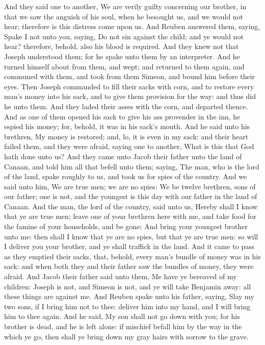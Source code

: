 \begin{biblechapter}
\verse And they said one to another, We are verily guilty concerning our brother, in that we saw the anguish of his soul, when he besought us, and we would not hear; therefore is this distress come upon us.
\verse And Reuben answered them, saying, Spake I not unto you, saying, Do not sin against the child; and ye would not hear? therefore, behold, also his blood is required.
\verse And they knew not that Joseph understood them; for he spake unto them by an interpreter.
\verse And he turned himself about from them, and wept; and returned to them again, and communed with them, and took from them Simeon, and bound him before their eyes.
\verse Then Joseph commanded to fill their sacks with corn, and to restore every man's money into his sack, and to give them provision for the way: and thus did he unto them.
\verse And they laded their asses with the corn, and departed thence.
\verse And as one of them opened his sack to give his ass provender in the inn, he espied his money; for, behold, it was in his sack's mouth.
\verse And he said unto his brethren, My money is restored; and, lo, it is even in my sack: and their heart failed them, and they were afraid, saying one to another, What is this that God hath done unto us?
\verse And they came unto Jacob their father unto the land of Canaan, and told him all that befell unto them; saying,
\verse The man, who is the lord of the land, spake roughly to us, and took us for spies of the country.
\verse And we said unto him, We are true men; we are no spies:
\verse We be twelve brethren, sons of our father; one is not, and the youngest is this day with our father in the land of Canaan.
\verse And the man, the lord of the country, said unto us, Hereby shall I know that ye are true men; leave one of your brethren here with me, and take food for the famine of your households, and be gone:
\verse And bring your youngest brother unto me: then shall I know that ye are no spies, but that ye are true men: so will I deliver you your brother, and ye shall traffick in the land.
\verse And it came to pass as they emptied their sacks, that, behold, every man's bundle of money was in his sack: and when both they and their father saw the bundles of money, they were afraid.
\verse And Jacob their father said unto them, Me have ye bereaved of my children: Joseph is not, and Simeon is not, and ye will take Benjamin away: all these things are against me.
\verse And Reuben spake unto his father, saying, Slay my two sons, if I bring him not to thee: deliver him into my hand, and I will bring him to thee again.
\verse And he said, My son shall not go down with you; for his brother is dead, and he is left alone: if mischief befall him by the way in the which ye go, then shall ye bring down my gray hairs with sorrow to the grave.
\end{biblechapter}

